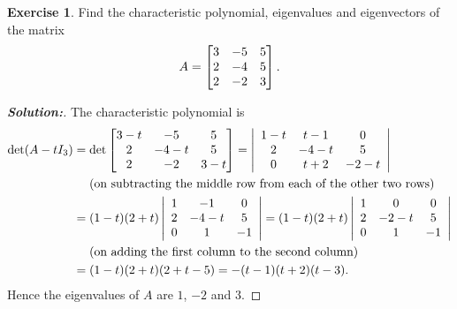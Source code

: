 \documentclass[a4paper]{amsart}
\theoremstyle{definition}
\newtheorem{exercise}{Exercise}
\newenvironment{solution}{\begin{proof}[\textbf{Solution:}] \vphantom{u}}{\end{proof}}
\begin{document}
\begin{exercise}\label{ex-evectrs-iv}
 Find the characteristic polynomial, eigenvalues and eigenvectors of
 the matrix 
 \[ A = \left[\begin{matrix} 
          3 & -5 & 5 \\
          2 & -4 & 5 \\
          2 & -2 & 3
         \end{matrix}\right].
 \]
\end{exercise}
\begin{solution}
 The characteristic polynomial is
     \begin{align*} \det (A - tI_3) &=
     \det \left[\begin{matrix}
     3-t & -5 & 5 \\
     2 & -4-t & 5 \\
     2 & -2 & 3-t
     \end{matrix}\right]= \left|\begin{array}{ccc}
 1-t & t-1 & 0 \\
     2 & -4-t & 5 \\
     0 & t+2 & -2-t
     \end{array}\right|\\& \quad \text{~(on subtracting the middle
     row from each of the other two rows)}\\ &
     = (1-t)(2+t)\left|\begin{array}{ccc}
 1 & -1 & 0 \\
     2 & -4-t & 5 \\
     0 & 1 & -1
     \end{array}\right| = (1-t)(2+t)\left|\begin{array}{ccc}
 1 & 0 & 0 \\
     2 & -2-t & 5 \\
     0 & 1 & -1
     \end{array}\right|\\& \quad \text{~(on adding the first column
     to the second column)}\\ &
     =(1-t)(2+t)(2+t-5) = -(t-1)(t+2)(t-3).
     \end{align*}
  Hence the eigenvalues of $A$
 are $1$, $-2$ and $3$.


\end{solution}
\end{document}
